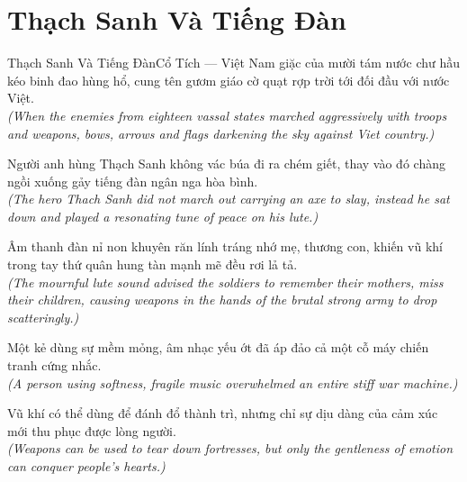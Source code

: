 \section{Thạch Sanh Và Tiếng Đàn}
\begin{truyen}{Thạch Sanh Và Tiếng Đàn}{Cổ Tích --- Việt Nam}
 giặc của mười tám nước chư hầu kéo binh đao hùng hổ, cung tên gươm giáo cờ quạt rợp trời tới đối đầu với nước Việt.\\[4pt]
\textit{(When the enemies from eighteen vassal states marched aggressively with troops and weapons, bows, arrows and flags darkening the sky against Viet country.)}

Người anh hùng Thạch Sanh không vác búa đi ra chém giết, thay vào đó chàng ngồi xuống gảy tiếng đàn ngân nga hòa bình.\\[4pt]
\textit{(The hero Thach Sanh did not march out carrying an axe to slay, instead he sat down and played a resonating tune of peace on his lute.)}

Âm thanh đàn nỉ non khuyên răn lính tráng nhớ mẹ, thương con, khiến vũ khí trong tay thứ quân hung tàn mạnh mẽ đều rơi lả tả.\\[4pt]
\textit{(The mournful lute sound advised the soldiers to remember their mothers, miss their children, causing weapons in the hands of the brutal strong army to drop scatteringly.)}

Một kẻ dùng sự mềm mỏng, âm nhạc yếu ớt đã áp đảo cả một cỗ máy chiến tranh cứng nhắc.\\[4pt]
\textit{(A person using softness, fragile music overwhelmed an entire stiff war machine.)}

\end{truyen}
\begin{baihoc}
  Vũ khí có thể dùng để đánh đổ thành trì, nhưng chỉ sự dịu dàng của cảm xúc mới thu phục được lòng người.\\[4pt]
  \textit{(Weapons can be used to tear down fortresses, but only the gentleness of emotion can conquer people's hearts.)}
\end{baihoc}

